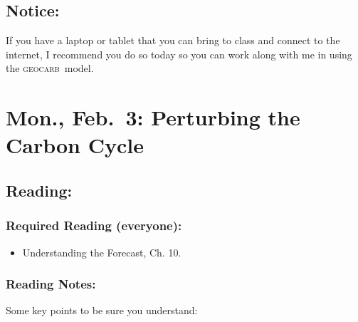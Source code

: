 \documentclass[
]{article}
\providecommand{\tightlist}{%
  \setlength{\itemsep}{0pt}\setlength{\parskip}{0pt}}
\newcommand{\GEOCARB}{\textsc{geocarb}}
\begin{document}
\hypertarget{notice-5}{%
\subsection{Notice:}\label{notice-5}}

If you have a laptop or tablet that you can bring to class and connect
to the internet, I recommend you do so today so you can work along with
me in using the \GEOCARB~model.

\hypertarget{mon.-feb.-3-perturbing-the-carbon-cycle}{%
\section{Mon., Feb.~3: Perturbing the Carbon
Cycle}\label{mon.-feb.-3-perturbing-the-carbon-cycle}}

\hypertarget{reading-11}{%
\subsection{Reading:}\label{reading-11}}

\hypertarget{required-reading-everyone-9}{%
\subsubsection{Required Reading
(everyone):}\label{required-reading-everyone-9}}

\begin{itemize}
\tightlist
\item
  Understanding the Forecast, Ch. 10.
\end{itemize}

\hypertarget{reading-notes-9}{%
\subsubsection{Reading Notes:}\label{reading-notes-9}}

Some key points to be sure you understand:
\end{document}
